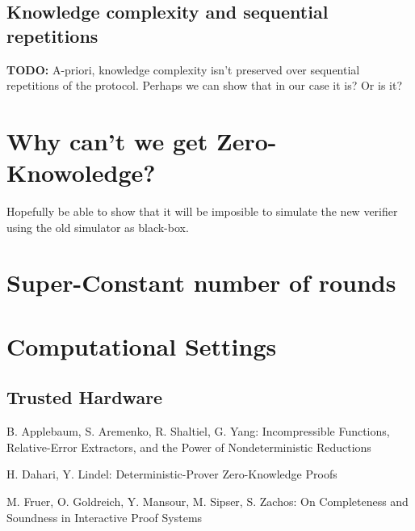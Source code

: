\documentclass[11]{article}
\begin{document}
\subsection{Knowledge complexity and sequential repetitions}
\textbf{TODO:}
A-priori, knowledge complexity isn't preserved over sequential repetitions of the protocol. Perhaps we can show that in our case it is? Or is it?

\section{Why can't we get Zero-Knowoledge?}
	\item Hopefully be able to show that it will be imposible to simulate the new verifier using the old simulator as black-box.	

\section{Super-Constant number of rounds}

\section{Computational Settings}

\subsection{Trusted Hardware}

\begin{thebibliography}{}
 B. Applebaum, S. Aremenko, R. Shaltiel, G. Yang: Incompressible Functions, Relative-Error Extractors, and the Power
of Nondeterministic Reductions

 H. Dahari, Y. Lindel: Deterministic-Prover Zero-Knowledge Proofs

 M. Fruer, O. Goldreich, Y. Mansour, M. Sipser, S. Zachos: On Completeness and Soundness in Interactive Proof Systems

\end{thebibliography}
\end{document}
